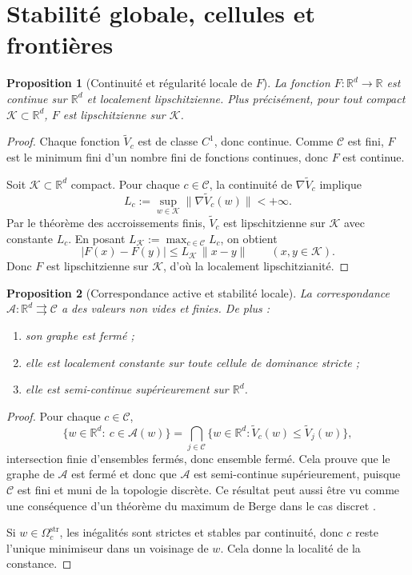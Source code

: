 \documentclass[11pt,a4paper]{article}
\newtheorem{proposition}{Proposition}[section]
\newcommand{\R}{\mathbb R}
\newcommand{\Ccal}{\mathcal C}
\begin{document}
\section{Stabilité globale, cellules et frontières}

\begin{proposition}[Continuité et régularité locale de \(F\)]
La fonction \(F:\R^d\to\R\) est continue sur \(\R^d\) et localement lipschitzienne. Plus précisément, pour tout compact \(\mathcal K\subset\R^d\), \(F\) est lipschitzienne sur \(\mathcal K\).
\end{proposition}

\begin{proof}
Chaque fonction \(\widetilde V_c\) est de classe \(C^1\), donc continue. Comme \(\Ccal\) est fini, \(F\) est le minimum fini d'un nombre fini de fonctions continues, donc \(F\) est continue.

Soit \(\mathcal K\subset\R^d\) compact. Pour chaque \(c\in\Ccal\), la continuité de \(\nabla \widetilde V_c\) implique
\[
L_c:=\sup_{w\in\mathcal K}\|\nabla \widetilde V_c(w)\|<+\infty.
\]
Par le théorème des accroissements finis, \(\widetilde V_c\) est lipschitzienne sur \(\mathcal K\) avec constante \(L_c\). En posant \(L_{\mathcal K}:=\max_{c\in\Ccal}L_c\), on obtient
\[
|F(x)-F(y)|
\le
L_{\mathcal K}\,\|x-y\|
\qquad (x,y\in\mathcal K).
\]
Donc \(F\) est lipschitzienne sur \(\mathcal K\), d'où la localement lipschitzianité.
\end{proof}

\begin{proposition}[Correspondance active et stabilité locale]
La correspondance \(\mathcal A:\R^d\rightrightarrows \Ccal\) a des valeurs non vides et finies. De plus :
\begin{enumerate}[leftmargin=2em]
\item son graphe est fermé ;
\item elle est localement constante sur toute cellule de dominance stricte ;
\item elle est semi-continue supérieurement sur \(\R^d\).
\end{enumerate}
\end{proposition}

\begin{proof}
Pour chaque \(c\in\Ccal\),
\[
\{w\in\R^d:\ c\in\mathcal A(w)\}
=
\bigcap_{j\in\Ccal}\{w\in\R^d:\widetilde V_c(w)\le \widetilde V_j(w)\},
\]
intersection finie d'ensembles fermés, donc ensemble fermé. Cela prouve que le graphe de \(\mathcal A\) est fermé et donc que \(\mathcal A\) est semi-continue supérieurement, puisque \(\Ccal\) est fini et muni de la topologie discrète. Ce résultat peut aussi être vu comme une conséquence d'un théorème du maximum de Berge dans le cas discret \cite{Berge1963}.

Si \(w\in\Omega_c^{\mathrm{str}}\), les inégalités sont strictes et stables par continuité, donc \(c\) reste l'unique minimiseur dans un voisinage de \(w\). Cela donne la localité de la constance.
\end{proof}
\end{document}
